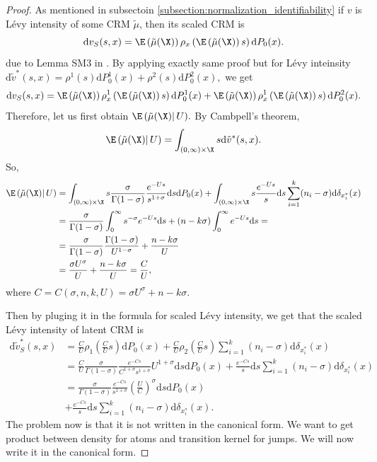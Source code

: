 \begin{proof}
As mentioned in subsectoin \ref{subsection:normalization_identifiability} if $v$ is L\'evy intensity of some CRM $\tilde{\mu}$, then its scaled CRM is 
\[
\mathrm{d}v_S(s,x) = \E \left(\tilde{\mu}(\X)\right) \rho_x\left( \E \left(\tilde{\mu}(\X)\right)s\right)\mathrm{d}P_0(x).
\]
due to Lemma SM3 in \cite{catalano2023merging}. By applying exactly same proof but for L\'evy inteinsity $\mathrm{d}\tilde{v}^*(s,x) = \rho^1(s)\mathrm{d}P^1_0(x) + \rho^2(s)\mathrm{d}P_0^2(x),$ we get
\[
\mathrm{d}v_S(s,x) =  \E \left(\tilde{\mu}(\X)\right) \rho^1_x\left(\E \left(\tilde{\mu}(\X)\right)s\right)\mathrm{d}P^1_0(x) + 
                       \E \left(\tilde{\mu}(\X)\right) \rho^1_x\left( \E \left(\tilde{\mu}(\X)\right)s\right)\mathrm{d}P^2_0(x).
\]
Therefore, let us first obtain $\E \left(\tilde{\mu}(\X)\right | U).$
By Cambpell's theorem,
\[
\E \left(\tilde{\mu}(\X)\right | U)  = \int_{(0,\infty)\times\X}s\mathrm{d}\tilde{v}^*(s,x).
\]
So,
\begin{align*}
    \E \left(\tilde{\mu}(\X)\right | U) & =\int_{(0,\infty)\times\X}s\frac{ \sigma}{\Gamma(1-\sigma)}\frac{e^{-Us}}{s^{1+\sigma}}\mathrm{d}s\mathrm{d}P_0(x) 
    +\int_{(0,\infty)\times\X}s\frac{e^{-Us}}{s}\mathrm{d}s\sum_{i = 1}^k(n_i - \sigma)\mathrm{d}\delta_{x_i^*}(x) \\
    & = \frac{ \sigma}{\Gamma(1-\sigma)}\int_0^\infty s^{-\sigma} e^{-Us}\mathrm{d}s + (n-k\sigma)\int_0^\infty e^{-Us}\mathrm{d}s = \\
    & = \frac{ \sigma}{\Gamma(1-\sigma)} \frac{\Gamma(1-\sigma)}{U^{1-\sigma}} + \frac{n - k\sigma}{U} \\
    & = \frac{ \sigma U^\sigma}{U} + \frac{n - k\sigma}{U} = \frac{C}{U},
\end{align*}
where
$C = C( \sigma, n, k, U) =  \sigma U^\sigma + n - k\sigma.$

Then by pluging it in the formula for scaled  L\'evy intensity, we get that the scaled L\'evy intensity of latent CRM is
\begin{align*}
    \mathrm{d}\tilde{v}^*_{S}(s,x) &= \frac{C}{U}\rho_1\left(\frac{C}{U}s \right)\mathrm{d}P_0(x) + 
    \frac{C}{U}\rho_2\left(\frac{C}{U}s \right)\sum_{i = 1}^k(n_i-\sigma)\mathrm{d}\delta_{x_i^*}(x) \\
    & = \frac{C}{U}\frac{ \sigma}{\Gamma(1-\sigma)}\frac{e^{-Cs}}{C^{1+\sigma}s^{1+\sigma}}U^{1+\sigma}\mathrm{d}s\mathrm{d}P_0(x) 
    + \frac{e^{-Cs}}{s}\mathrm{d}s \sum_{i = 1}^k(n_i-\sigma)\mathrm{d}\delta_{x_i^*}(x) \\ 
    & = \frac{ \sigma}{\Gamma(1-\sigma)}\frac{e^{-Cs}}{s^{1+\sigma}}\left(\frac{U}{C} \right)^\sigma\mathrm{d}s \mathrm{d}P_0(x) \\
    & + \frac{e^{-Cs}}{s}\mathrm{d}s\sum_{i  =1}^k (n_i - \sigma) \mathrm{d}\delta_{x_i^*}(x).
\end{align*}
The problem now is that it is not written in the canonical form. We want to get product between density for atoms and transition kernel for jumps. We will now write it in the canonical form.


\end{proof}
